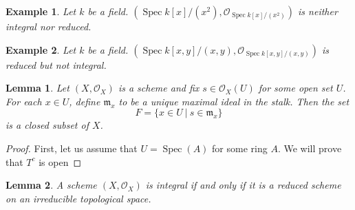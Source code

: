 \documentclass{article}
\newtheorem{lemma}{Lemma}[section]
\newtheorem{example}{Example}[section]
\numberwithin{equation}{section}
\DeclareMathOperator{\Spec}{Spec}
\begin{document}
\begin{example}
Let $k$ be a field. $(\Spec k[x]/(x^2),\mathcal{O}_{\Spec k[x]/(x^2)})$ is neither integral nor reduced.%
\end{example}

\begin{example}
Let $k$ be a field. $(\Spec k[x,y]/(x,y),\mathcal{O}_{\Spec k[x,y]/(x,y)})$ is reduced but not integral. %
\end{example}

\begin{lemma}
Let $(X,\mathcal{O}_X)$ is a scheme and fix $s\in\mathcal{O}_X(U)$ for some open set $U$. For each $x\in U$, define $\mathfrak{m}_x$ to be a unique maximal ideal in the stalk. Then the set
\begin{equation*}
F=\{x\in U\:|\: s\in\mathfrak{m}_x\}
\end{equation*}
is a closed subset of $X$.
\label{closed_subset_local_ring}
\end{lemma}

\begin{proof}
First, let us assume that $U=\Spec(A)$ for some ring $A$. We will prove that $T^c$ is open%
\end{proof}

\begin{lemma}
A scheme $(X,\mathcal{O}_X)$ is integral if and only if it is a reduced scheme on an irreducible topological space. 
\end{lemma}
\end{document}
